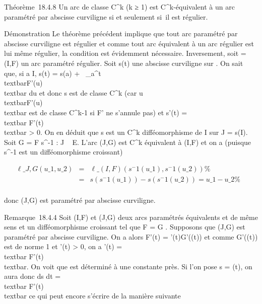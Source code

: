 \documentclass[]{article}
\begin{document}
Théorème~18.4.8 Un arc de classe C^k (k ≥ 1) est
C^k-équivalent à un arc paramétré par abscisse curviligne si
et seulement si~il est régulier.

Démonstration Le théorème précédent implique que tout arc paramétré par
abscisse curviligne est régulier et comme tout arc équivalent à un arc
régulier est lui même régulier, la condition est évidemment nécessaire.
Inversement, soit \Gamma = (I,F) un arc paramétré régulier. Soit s(t) une
abscisse curviligne sur \Gamma. On sait que, si a \in I, s(t) = s(a)
+\int ~
\_a^t\\textbar{}F'(u)\\textbar{}
du et donc s est de classe C^k (car
u\mapsto~\\textbar{}F'(u)\\textbar{}
est de classe C^k-1 si F' ne s'annule pas) et s'(t)
=\\textbar{} F'(t)\\textbar{}
\textgreater{} 0. On en déduit que s est un C^k
difféomorphisme de I sur J = s(I). Soit G = F \cdot s^-1 : J \rightarrow~ E.
L'arc (J,G) est C^k équivalent à (I,F) et on a (puisque
s^-1 est un difféomorphisme croissant)

\begin{align*}
\ell\_J,G(u\_1,u\_2)& =&
\ell\_(I,F)(s^-1(u\_
1),s^-1(u\_ 2)) \%&
\\ & =& s(s^-1(u\_
1)) - s(s^-1(u\_ 2)) = u\_1 -
u\_2\%& \\
\end{align*}

donc (J,G) est paramétré par abscisse curviligne.

Remarque~18.4.4 Soit (I,F) et (J,G) deux arcs paramétrés équivalents et
de même sens et \theta un difféomorphisme croissant tel que F = G \cdot \theta.
Supposons que (J,G) est paramétré par abscisse curviligne. On a alors
F'(t) = \theta'(t)G'(\theta(t)) et comme G'(\theta(t)) est de norme 1 et \theta'(t)
\textgreater{} 0, on a \theta'(t) =\\textbar{}
F'(t)\\textbar{}. On voit que \theta est déterminé à une
constante près. Si l'on pose s = \theta(t), on aura donc  ds
\over dt =\\textbar{}
F'(t)\\textbar{} ce qui peut encore s'écrire de la
manière suivante
\end{document}
